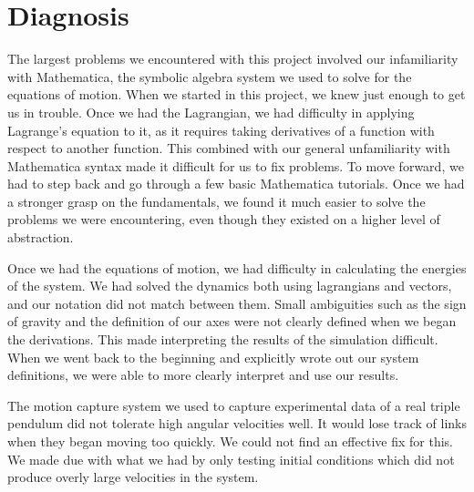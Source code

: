 \section{Diagnosis}
The largest problems we encountered with this project involved our infamiliarity with Mathematica, the symbolic algebra system we used to solve for the equations of motion. When we started in this project, we knew just enough to get us in trouble. Once we had the Lagrangian, we had difficulty in applying Lagrange's equation to it, as it requires taking derivatives of a function with respect to another function. This combined with our general unfamiliarity with Mathematica syntax made it difficult for us to fix problems. To move forward, we had to step back and go through a few basic Mathematica tutorials. Once we had a stronger grasp on the fundamentals, we found it much easier to solve the problems we were encountering, even though they existed on a higher level of abstraction.

Once we had the equations of motion, we had difficulty in calculating the energies of the system. We had solved the dynamics both using lagrangians and vectors, and our notation did not match between them. Small ambiguities such as the sign of gravity and the definition of our axes were not clearly defined when we began the derivations. This made interpreting the results of the simulation difficult. When we went back to the beginning and explicitly wrote out our system definitions, we were able to more clearly interpret and use our results.

The motion capture system we used to capture experimental data of a real triple pendulum did not tolerate high angular velocities well. It would lose track of links when they began moving too quickly. We could not find an effective fix for this. We made due with what we had by only testing initial conditions which did not produce overly large velocities in the system.
